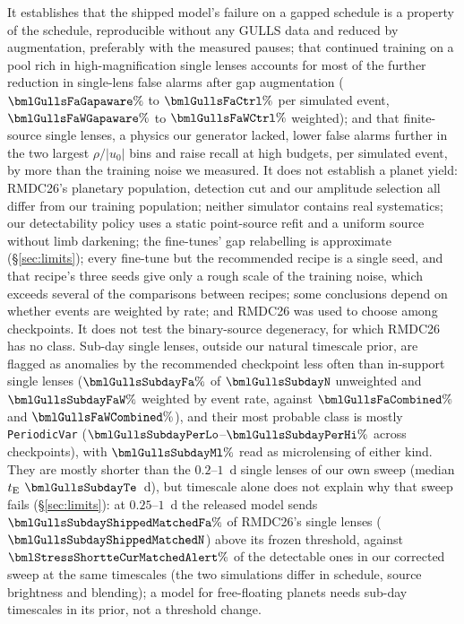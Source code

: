 It establishes that the shipped model's failure on a gapped schedule is a property of the schedule,
reproducible without any GULLS data and reduced by augmentation, preferably with the measured pauses;
that continued training on a pool rich in high-magnification single lenses accounts for most of the further
reduction in single-lens false alarms after gap augmentation ($\bmlGullsFaGapaware\%$ to $\bmlGullsFaCtrl\%$ per
simulated event, $\bmlGullsFaWGapaware\%$ to $\bmlGullsFaWCtrl\%$ weighted); and that finite-source single
lenses, a physics our generator lacked, lower false alarms further in the two largest $\rho/|u_0|$ bins and raise
recall at high budgets, per simulated event, by more than the training noise we measured. It does
not establish a \Rom{} planet yield: RMDC26's planetary population, detection cut and our amplitude
selection all differ from our training population; neither simulator contains real systematics; our
detectability policy uses a static point-source refit and a uniform source without limb darkening; the
fine-tunes' gap relabelling is approximate (\S\ref{sec:limits}); every fine-tune but the recommended recipe is a
single seed, and that recipe's three seeds give only a rough scale of the training noise, which exceeds several
of the comparisons between recipes; some
conclusions depend on whether events are weighted by rate; and RMDC26 was used to choose among
checkpoints. It does not test the binary-source degeneracy, for which
RMDC26 has no class. Sub-day single lenses, outside our natural timescale prior, are flagged as anomalies by the
recommended checkpoint less often than in-support single lenses ($\bmlGullsSubdayFa\%$ of
$\bmlGullsSubdayN$ unweighted and $\bmlGullsSubdayFaW\%$ weighted by event rate, against
$\bmlGullsFaCombined\%$ and $\bmlGullsFaWCombined\%$), and their most probable class is mostly
\texttt{PeriodicVar} ($\bmlGullsSubdayPerLo$--$\bmlGullsSubdayPerHi\%$ across checkpoints), with
$\bmlGullsSubdayMl\%$ read as microlensing of either kind. They are mostly shorter than the $0.2$--$1$~d single lenses of our
own sweep (median $t_{\rm E}$ $\bmlGullsSubdayTe$~d), but timescale alone does not explain why that sweep fails
(\S\ref{sec:limits}): at $0.25$--$1$~d the released model sends $\bmlGullsSubdayShippedMatchedFa\%$ of RMDC26's
single lenses ($\bmlGullsSubdayShippedMatchedN$) above its frozen threshold, against
$\bmlStressShortteCurMatchedAlert\%$ of the detectable ones in our corrected sweep at the same timescales (the two simulations
differ in schedule, source brightness and blending); a model for free-floating planets needs sub-day timescales in its prior, not a
threshold change.


